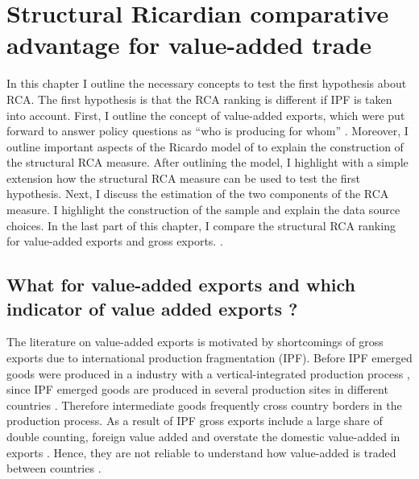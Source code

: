 \chapter{Structural Ricardian comparative advantage for value-added trade}
\label{cha:empirical}
In this chapter I outline the necessary concepts to test the first hypothesis about RCA.
The first hypothesis is that the RCA ranking is different if IPF is taken into account.
First, I outline the concept of value-added exports, which were put forward to answer policy questions as ``who is producing for whom'' \textcite{daudin2011}.
 Moreover, I outline important aspects of the Ricardo model of \textcite{costinot} to explain the construction of the structural RCA measure.
 After outlining the model, I highlight with a simple extension how the structural RCA measure can be used to test the first hypothesis.
Next, I discuss the estimation of the two components of the RCA measure.
I highlight the construction of the sample and explain the data source choices.
In the last part of this chapter, I compare the structural RCA ranking for value-added exports and gross exports.
. %
\section{What for value-added exports and which indicator of value added exports ?} \label{sec:vax}
The literature on value-added exports is motivated by shortcomings of gross exports due to international production fragmentation (IPF).
Before IPF emerged goods were produced in a industry with a vertical-integrated production process \textcite{Feenstra}, since IPF emerged
goods are produced in several production sites in different countries \textcite{daudin2011}.
Therefore intermediate goods frequently cross country borders in the production process.
 As a result of IPF gross exports include a large share of double counting, foreign value added and overstate the domestic value-added in exports \textcite{johson}.
Hence, they are not reliable to understand how value-added is traded between countries \parencite{johnson}. \par

